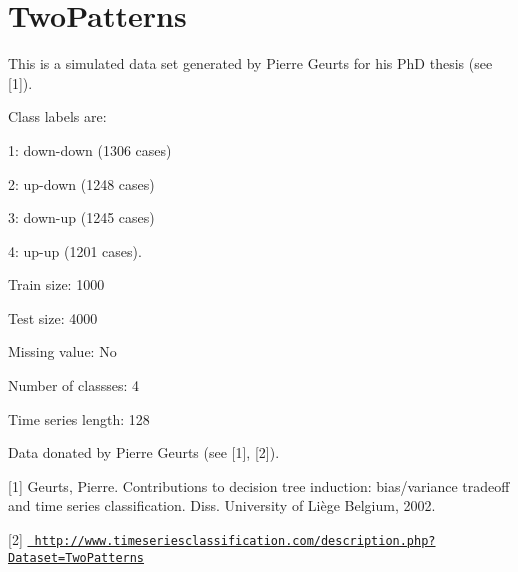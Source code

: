 \chapter{Two\+Patterns}
\hypertarget{md_external_2data_2UCRArchive__2018_2TwoPatterns_2README}{}\label{md_external_2data_2UCRArchive__2018_2TwoPatterns_2README}
\label{md_external_2data_2UCRArchive__2018_2TwoPatterns_2README_autotoc_md223}%
%
 This is a simulated data set generated by Pierre Geurts for his PhD thesis (see \mbox{[}1\mbox{]}).

Class labels are\+:
\begin{DoxyItemize}
\item 1\+: down-\/down (1306 cases)
\item 2\+: up-\/down (1248 cases)
\item 3\+: down-\/up (1245 cases)
\item 4\+: up-\/up (1201 cases).
\end{DoxyItemize}

Train size\+: 1000

Test size\+: 4000

Missing value\+: No

Number of classses\+: 4

Time series length\+: 128

Data donated by Pierre Geurts (see \mbox{[}1\mbox{]}, \mbox{[}2\mbox{]}).

\mbox{[}1\mbox{]} Geurts, Pierre. Contributions to decision tree induction\+: bias/variance tradeoff and time series classification. Diss. University of Liège Belgium, 2002.

\mbox{[}2\mbox{]} \href{http://www.timeseriesclassification.com/description.php?Dataset=TwoPatterns}{\texttt{ http\+://www.\+timeseriesclassification.\+com/description.\+php?\+Dataset=\+Two\+Patterns}} 